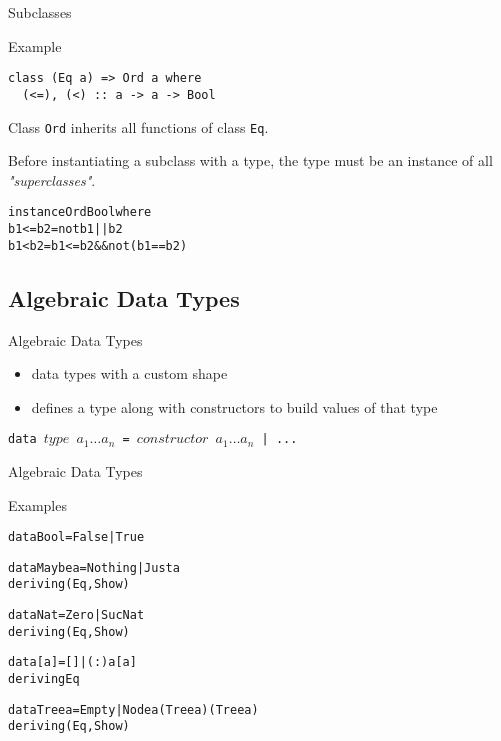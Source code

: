 \documentclass{beamer}
\def\code#1{\texttt{\frenchspacing#1}}
\begin{document}
\begin{frame}[fragile]{Subclasses}

\begin{exampleblock}{Example}
\begin{verbatim}
class (Eq a) => Ord a where
  (<=), (<) :: a -> a -> Bool
\end{verbatim}

Class \code{Ord} inherits all functions of class \code{Eq}.
\end{exampleblock}

\pause

\vspace{1cm}
Before instantiating a subclass with a type, the type must be an instance of all \textit{"superclasses"}.

\pause

\begin{alltt}
instance Ord Bool where\pause
  b1 <= b2 = not b1 || b2\pause
  b1 < b2 = b1 <= b2 && not(b1 == b2)
\end{alltt}

\end{frame}

\subsection{Algebraic Data Types}

\begin{frame}{Algebraic Data Types}

\begin{itemize}
    \item data types with a custom shape
    \item defines a type along with constructors to build values of that type
\end{itemize}

\pause

\begin{block}{\centering \code{data $type$ $a_1 \dots a_n$ = $constructor$ $a_1 \dots a_n$ | ...}}
\end{block}

\end{frame}

\begin{frame}[fragile]{Algebraic Data Types}

\begin{exampleblock}{Examples}
\begin{alltt}
data Bool = False | True\pause

data Maybe a = Nothing | Just a
  deriving (Eq, Show)\pause

data Nat = Zero | Suc Nat
  deriving (Eq, Show)\pause

data [a] = [] | (:) a [a]
  deriving Eq\pause

data Tree a = Empty | Node a (Tree a) (Tree a)
  deriving (Eq, Show)
\end{alltt}
\end{exampleblock}

\end{frame}
\end{document}
